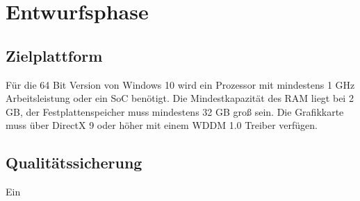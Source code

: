 \section{Entwurfsphase}
\label{sec:Entwurfsphase}

\subsection{Zielplattform}
\label{sec:Zielplattform}
Für die 64 Bit Version von Windows 10 wird ein Prozessor mit mindestens 1 GHz Arbeitsleistung oder ein {\acs{SoC}} benötigt. Die Mindestkapazität des RAM liegt bei 2 GB, der Festplattenspeicher muss mindestens 32 GB groß sein. Die Grafikkarte muss über DirectX 9 oder höher mit einem {\acs{WDDM}} 1.0 Treiber verfügen.

\subsection{Qualitätssicherung}
\label{sec:Qualitätssicherung}
Ein